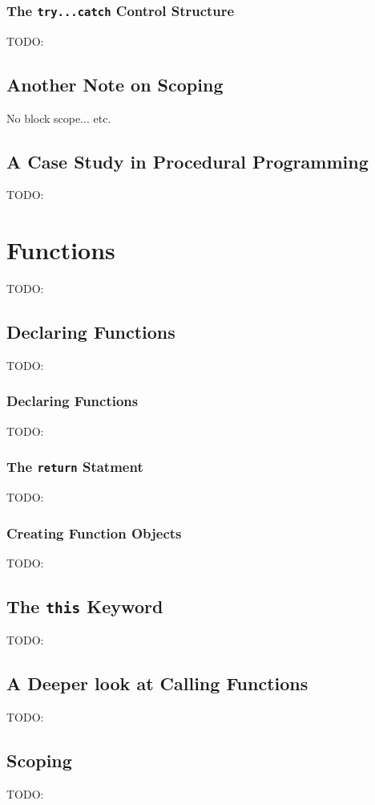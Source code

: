 \documentclass[11pt,letter]{book}
\begin{document}
    \subsection{The \texttt{try...catch} Control Structure}
    TODO:
    
    \section{Another Note on Scoping}
    No block scope... etc.
    
    \section{A Case Study in Procedural Programming}
    TODO:
    
    \chapter{Functions}
    TODO:
    
    \section{Declaring Functions}
    TODO:
    
    \subsection{Declaring Functions}
    TODO:
    
    \subsection{The \texttt{return} Statment}
    TODO:
    
    \subsection{Creating Function Objects}
    TODO:
    
    \section{The \texttt{this} Keyword}
    TODO:
    
    \section{A Deeper look at Calling Functions}
    TODO:
    
    \section{Scoping}
    TODO:
    
\end{document}
